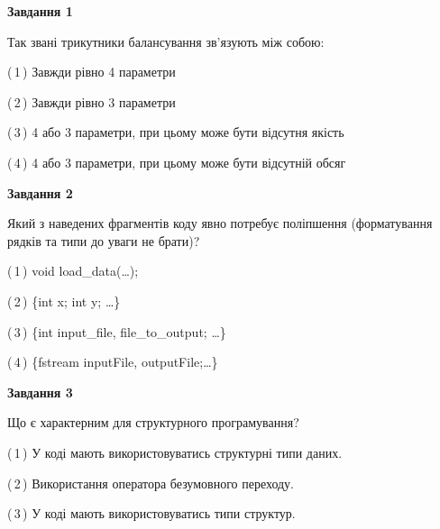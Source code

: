 \documentclass[10pt, ukrainian]{article}
\begin{document}
{
\begin {large}
{\begin {center}\textbf{Завдання 1}\end {center}}\par
Так звані трикутники балансування зв'язують між собою:\par
\vspace{2mm}



(\,1\,) Завжди рівно 4 параметри%



(\,2\,) Завжди рівно 3 параметри%



(\,3\,) 4 або 3 параметри, при цьому може бути відсутня якість%



(\,4\,) 4 або 3 параметри, при цьому може бути відсутній обсяг %


{\begin {center}\textbf{Завдання 2}\end {center}}\par
Який з наведених фрагментів коду явно потребує поліпшення (форматування рядків та типи до уваги не брати)?\par
\vspace{2mm}



(\,1\,) void load\_data(…);%



(\,2\,) \{int x; int y; …\}%



(\,3\,) \{int input\_file, file\_to\_output; …\}%



(\,4\,) \{fstream inputFile, outputFile;…\} %


{\begin {center}\textbf{Завдання 3}\end {center}}\par
Що є характерним для структурного програмування?\par
\vspace{2mm}



(\,1\,) У коді мають використовуватись структурні типи даних. %



(\,2\,) Використання оператора безумовного переходу. %



(\,3\,) У коді мають використовуватись типи структур. %




\end{large}}
\end{document}
